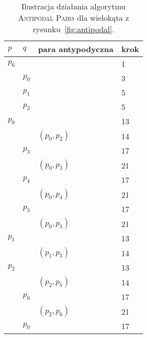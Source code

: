 \begin{table}[htb]
  \centering

  \begin{tabular}{llll}
    \toprule
    $p$ & $q$ & para antypodyczna & krok \\
    \midrule
    $p_6$ & & & 1 \\
    \midrule
    & $p_0$ & & 3 \\
    \midrule
    & $p_1$ & & 5 \\
    \midrule
    & $p_2$ & & 5 \\
    \midrule
    $p_0$& & & 13 \\
    \midrule
    & & $(p_0, p_2)$ & 14 \\
    \midrule
    & $p_3$ & & 17 \\
    \midrule
    & & $(p_0, p_3)$ & 21 \\
    \midrule
    & $p_4$ & & 17 \\
    \midrule
    & & $(p_0, p_4)$ & 21 \\
    \midrule
    & $p_5$ & & 17 \\
    \midrule
    & & $(p_0, p_5)$ & 21 \\
    \midrule
    $p_1$ & & & 13 \\
    \midrule
    & & $(p_1, p_5)$ & 14 \\
    \midrule
    $p_2$ & & & 13 \\
    \midrule
    & & $(p_2, p_5)$ & 14 \\
     \midrule
    & $p_6$ & & 17 \\
    \midrule
    & & $(p_2, p_6)$ & 21 \\
     \midrule
    & $p_0$ & & 17 \\
    \bottomrule
  \end{tabular}

  \caption{Ilustracja działania algorytmu  \textsc{Antipodal Pairs} dla
    wielokąta z rysunku~\ref{fig:antipodal}.}
\end{table}

